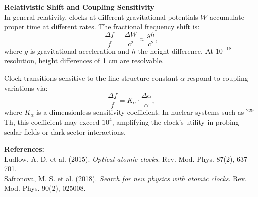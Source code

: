 \begin{technical}
\textbf{Relativistic Shift and Coupling Sensitivity}\\[0.5em]
In general relativity, clocks at different gravitational potentials $W$ accumulate proper time at different rates. The fractional frequency shift is:
\[
\frac{\Delta f}{f} = \frac{\Delta W}{c^2} \approx \frac{gh}{c^2},
\]
where $g$ is gravitational acceleration and $h$ the height difference. At $10^{-18}$ resolution, height differences of 1 cm are resolvable.

Clock transitions sensitive to the fine-structure constant $\alpha$ respond to coupling variations via:
\[
\frac{\Delta f}{f} = K_\alpha \cdot \frac{\Delta \alpha}{\alpha},
\]
where $K_\alpha$ is a dimensionless sensitivity coefficient. In nuclear systems such as $^{229}$Th, this coefficient may exceed $10^4$, amplifying the clock’s utility in probing scalar fields or dark sector interactions.

\vspace{0.5em}
\textbf{References:}\\
{\footnotesize
Ludlow, A. D. et al. (2015). \textit{Optical atomic clocks}. Rev. Mod. Phys. 87(2), 637–701.\\
Safronova, M. S. et al. (2018). \textit{Search for new physics with atomic clocks}. Rev. Mod. Phys. 90(2), 025008.
}
\end{technical}
